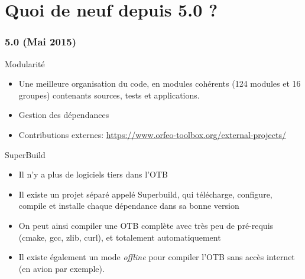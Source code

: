 \documentclass[8pt]{beamer}
\begin{document}
\section{Quoi de neuf depuis 5.0 ?}

\begin{frame}
\frametitle{5.0 (Mai 2015)}
\begin{block}{Modularité}
\begin{itemize}
\item Une meilleure organisation du code, en modules cohérents (124 modules et
    16 groupes) contenants sources, tests et applications.
\item Gestion des dépendances
\item Contributions externes: \url{https://www.orfeo-toolbox.org/external-projects/}
\end{itemize}
\end{block}

\begin{block}{SuperBuild}
\begin{itemize}
\item Il n'y a plus de logiciels tiers dans l'OTB
\item Il existe un projet séparé appelé Superbuild, qui télécharge, configure, compile et installe chaque dépendance dans sa bonne version
\item On peut ainsi compiler une OTB complète avec très peu de pré-requis (cmake, gcc, zlib, curl), et totalement automatiquement
\item Il existe également un mode \textit{offline} pour compiler l'OTB sans
  accès internet (en avion par exemple).
\end{itemize}
\end{block}
\end{frame}
\end{document}
